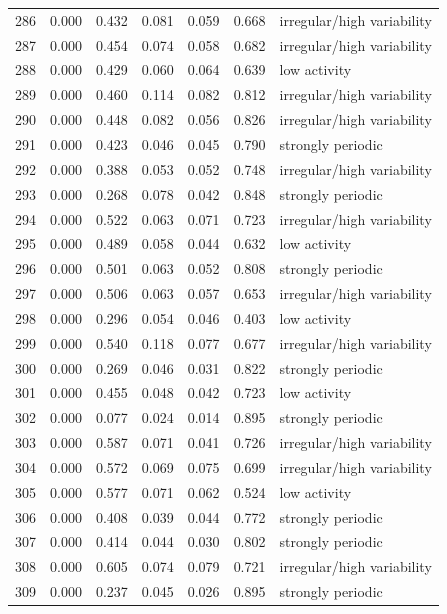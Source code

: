 \begin{longtable}{lrrrrrl}
286 & 0.000 & 0.432 & 0.081 & 0.059 & 0.668 & irregular/high variability \\
287 & 0.000 & 0.454 & 0.074 & 0.058 & 0.682 & irregular/high variability \\
288 & 0.000 & 0.429 & 0.060 & 0.064 & 0.639 & low activity \\
289 & 0.000 & 0.460 & 0.114 & 0.082 & 0.812 & irregular/high variability \\
290 & 0.000 & 0.448 & 0.082 & 0.056 & 0.826 & irregular/high variability \\
291 & 0.000 & 0.423 & 0.046 & 0.045 & 0.790 & strongly periodic \\
292 & 0.000 & 0.388 & 0.053 & 0.052 & 0.748 & irregular/high variability \\
293 & 0.000 & 0.268 & 0.078 & 0.042 & 0.848 & strongly periodic \\
294 & 0.000 & 0.522 & 0.063 & 0.071 & 0.723 & irregular/high variability \\
295 & 0.000 & 0.489 & 0.058 & 0.044 & 0.632 & low activity \\
296 & 0.000 & 0.501 & 0.063 & 0.052 & 0.808 & strongly periodic \\
297 & 0.000 & 0.506 & 0.063 & 0.057 & 0.653 & irregular/high variability \\
298 & 0.000 & 0.296 & 0.054 & 0.046 & 0.403 & low activity \\
299 & 0.000 & 0.540 & 0.118 & 0.077 & 0.677 & irregular/high variability \\
300 & 0.000 & 0.269 & 0.046 & 0.031 & 0.822 & strongly periodic \\
301 & 0.000 & 0.455 & 0.048 & 0.042 & 0.723 & low activity \\
302 & 0.000 & 0.077 & 0.024 & 0.014 & 0.895 & strongly periodic \\
303 & 0.000 & 0.587 & 0.071 & 0.041 & 0.726 & irregular/high variability \\
304 & 0.000 & 0.572 & 0.069 & 0.075 & 0.699 & irregular/high variability \\
305 & 0.000 & 0.577 & 0.071 & 0.062 & 0.524 & low activity \\
306 & 0.000 & 0.408 & 0.039 & 0.044 & 0.772 & strongly periodic \\
307 & 0.000 & 0.414 & 0.044 & 0.030 & 0.802 & strongly periodic \\
308 & 0.000 & 0.605 & 0.074 & 0.079 & 0.721 & irregular/high variability \\
309 & 0.000 & 0.237 & 0.045 & 0.026 & 0.895 & strongly periodic \\

\end{longtable}
